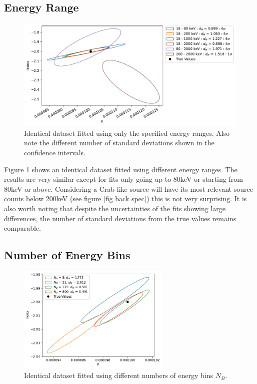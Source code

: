 \documentclass{report}
\begin{document}
\subsection{Energy Range}

\begin{figure}[h]
  \centering
  \includegraphics[width=\textwidth]{Images/Pure_Simulation/combined_plot_energy_range.pdf}
  \caption{Identical dataset fitted using only the specified energy ranges. Also note the different number of standard deviations shown in the confidence intervals.}
  \label{fig energy range}
\end{figure}

Figure \ref{fig energy range} shows an identical dataset fitted using different energy ranges. The results are very similar except for fits only going up to 80keV or starting from 80keV or above. Considering a Crab-like source will have its most relevant source counts below 200keV (see figure \ref{fig back spec}) this is not very surprising. It is also worth noting that despite the uncertainties of the fits showing large differences, the number of standard deviations from the true values remains comparable. 




\subsection{Number of Energy Bins}

\begin{figure}[h]
  \centering
  \includegraphics[width=0.65\textwidth]{Images/Pure_Simulation/combined_plot_num_e_bins.pdf}
  \caption{Identical dataset fitted using different numbers of energy bins $N_B$.}
  \label{fig num bins}
\end{figure}
\end{document}
